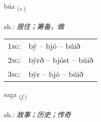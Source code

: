 \documentclass[frontgrid, backgrid]{flacards}\usepackage[]{graphicx}\usepackage[]{xcolor}
\begin{document}
\renewcommand{\flhead}{\vskip5pt \fboxsep=0pt {\small\bfseries\footnotesize Sagnorð | 动词}}
\renewcommand{\fcfoot}{\vskip5pt \fboxsep=0pt \hspace{2pt}{\small\bfseries\footnotesize 1K}}

\renewcommand{\blhead}{\vskip5pt {\small\bfseries\footnotesize Sagnorð | 动词 }}
\renewcommand{\bcfoot}{\vskip5pt \hspace{2pt}{\small\bfseries\footnotesize 1K}}


{búa \small{\textsubscript{(\textit{v.})}} \\[1ex] %
\textphonetic{[puːa]} \\
zh.: \emph{居住；筹备，做} \\  [2ex]
\renewcommand*{\arraystretch}{0.8}
\begin{tabular}{p{1cm}l}
\textsc{1sg}: & bý -- bjó -- búið \\ 
\textsc{2sg}: & býrð -- bjóst -- búið \\ 
\textsc{3sg}: & býr -- bjó -- búið \\ 
\end{tabular}
}

\renewcommand{\flhead}{\vskip5pt \fboxsep=0pt {\small\bfseries\footnotesize Nafnorð | 名词}}
\renewcommand{\fcfoot}{\vskip5pt \fboxsep=0pt \hspace{2pt}{\small\bfseries\footnotesize 1K}}

\renewcommand{\blhead}{\vskip5pt {\small\bfseries\footnotesize Nafnorð | 名词 }}
\renewcommand{\bcfoot}{\vskip5pt \hspace{2pt}{\small\bfseries\footnotesize 1K}}


{saga \small{\textsubscript{(\textit{f.})}} \\[1ex] %
\textphonetic{[saːɣa]} \\
zh.: \emph{故事；历史；传奇} \\  [2ex]
\renewcommand*{\arraystretch}{0.8}
}
\end{document}
